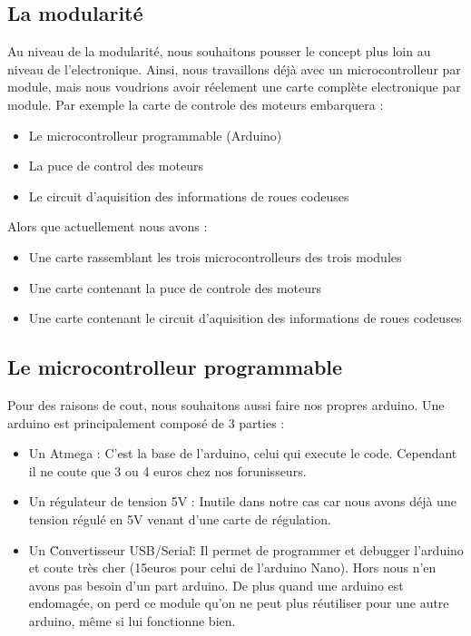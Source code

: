 \subsection{La modularité}
Au niveau de la modularité, nous souhaitons pousser le concept plus loin au niveau de l'electronique. Ainsi, nous travaillons déjà avec un microcontrolleur par module, mais nous voudrions avoir réelement une carte complète electronique par module. Par exemple la carte de controle des moteurs embarquera :
\begin{itemize}
	\item Le microcontrolleur programmable (Arduino)
	\item La puce de control des moteurs
	\item Le circuit d'aquisition des informations de roues codeuses
\end{itemize}
Alors que actuellement nous avons :
\begin{itemize}
	\item Une carte rassemblant les trois microcontrolleurs des trois modules
	\item Une carte contenant la puce de controle des moteurs
	\item Une carte contenant le circuit d'aquisition des informations de roues codeuses
\end{itemize}

\subsection{Le microcontrolleur programmable}


Pour des raisons de cout, nous souhaitons aussi faire nos propres arduino. Une arduino est principalement composé de 3 parties :

\begin{itemize}
	\item Un Atmega : C'est la base de l'arduino, celui qui execute le code. Cependant il ne coute que 3 ou 4 euros chez nos forunisseurs.
	\item Un régulateur de tension 5V : Inutile dans notre cas car nous avons déjà une tension régulé en 5V venant d'une carte de régulation.
	\item Un \"Convertisseur USB/Serial\" : Il permet de programmer et debugger l'arduino et coute très cher (15euros pour celui de l'arduino Nano). Hors nous n'en avons pas besoin d'un part arduino. De plus quand une arduino est endomagée, on perd ce module qu'on ne peut plus réutiliser pour une autre arduino, même si lui fonctionne bien.
\end{itemize}

